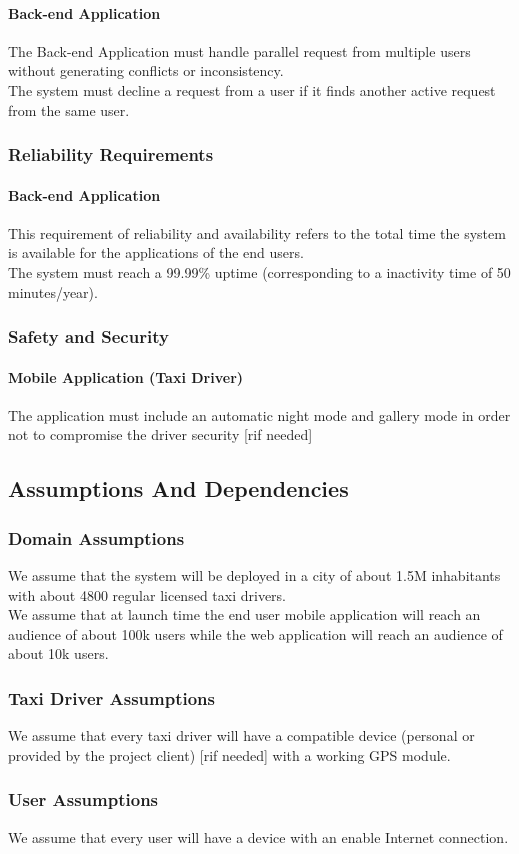 \documentclass[12pt, a4paper]{article}
\begin{document}
\paragraph{Back-end Application} 
The Back-end Application must handle parallel request from multiple users without generating conflicts or inconsistency.\\
The system must decline a request from a user if it finds another active request from the same user.

\subsubsection{Reliability Requirements} 
\label{ssub:reliability_requirements}
\paragraph{Back-end Application} 
This requirement of reliability and availability refers to the total time the system is available for the applications of the end users.\\
The system must reach a 99.99\% uptime (corresponding to a inactivity time of 50 minutes/year).
\subsubsection{Safety and Security} 
\label{ssub:safety_and_security}
\paragraph{Mobile Application (Taxi Driver)} 
The application must include an automatic night mode and gallery mode in order not to compromise the driver security [rif needed]

\subsection{Assumptions And Dependencies} 
\label{sub:assumptions_and_dependencies}
\subsubsection{Domain Assumptions} 
\label{ssub:domain}
We assume that the system will be deployed in a city of about 1.5M inhabitants with about 4800 regular licensed taxi drivers.\\
We assume that at launch time the end user mobile application will reach an audience of about 100k users while the web application will reach an audience of about 10k users.
\subsubsection{Taxi Driver Assumptions} 
We assume that every taxi driver will have a compatible device (personal or provided by the project client) [rif needed] with a working GPS module.
\subsubsection{User Assumptions} 
\label{ssub:user_assumptions}
We assume that every user will have a device with an enable Internet connection.
\end{document}
